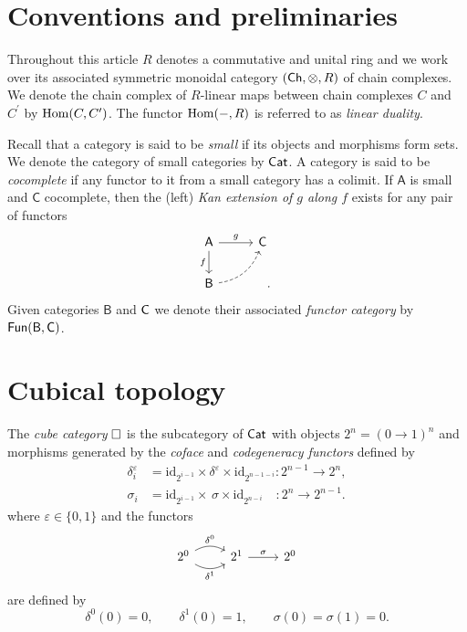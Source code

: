 
\section{Conventions and preliminaries}

Throughout this article $R$ denotes a commutative and unital ring and we work over its associated symmetric monoidal category $(\mathsf{Ch}, \otimes, R)$ of chain complexes.
We denote the chain complex of $R$-linear maps between chain complexes $C$ and $C^\prime$ by $\mathrm{Hom}(C, C^\prime)$.
The functor $\mathrm{Hom}(-, R)$ is referred to as \textit{linear duality}.

Recall that a category is said to be \textit{small} if its objects and morphisms form sets.
We denote the category of small categories by $\mathsf{Cat}$.
A category is said to be \textit{cocomplete} if any functor to it from a small category has a colimit.
If $\mathsf{A}$ is small and $\mathsf{C}$ cocomplete, then the (left) \textit{Kan extension of $g$ along $f$} exists for any pair of functors
\begin{equation*}
\begin{tikzcd}[column sep=normal, row sep=normal]
\mathsf{A} \arrow[d, "f"'] \arrow[r, "g"] & \mathsf{C} \\ 
\mathsf{B} \arrow[dashed, ur, bend right] & \quad .
\end{tikzcd}
\end{equation*}
Given categories $\mathsf{B}$ and $\mathsf{C}$ we denote their associated \textit{functor category} by $\mathsf{Fun}(\mathsf{B}, \mathsf{C})$.

\section{Cubical topology}

The \textit{cube category} $\square$ is the subcategory of $\mathsf{Cat}$ with objects $2^n = (0 \to 1)^n$ and morphisms generated by the \textit{coface} and \textit{codegeneracy functors} defined by
\begin{align*}
\delta_i^\varepsilon & = \mathrm{id}_{2^{i-1}} \times \delta^\varepsilon \times \mathrm{id}_{2^{n-1-i}} \colon 2^{n-1} \to 2^n, \\
\sigma_i & = \mathrm{id}_{2^{i-1}} \times \, \sigma \times \mathrm{id}_{2^{n-i}} \quad \colon 2^{n} \to 2^{n-1}.
\end{align*}
where $\varepsilon \in \{0,1\}$ and the functors
\begin{equation*}
\begin{tikzcd}
2^0 \arrow[r, bend left, "\delta^0"] \arrow[r, bend right, "\delta^1"'] & 2^1 \arrow[r, "\sigma"] & 2^0
\end{tikzcd}
\end{equation*}
are defined by
\begin{equation*}
\delta^0(0) = 0, \qquad \delta^1(0) = 1, \qquad \sigma(0) = \sigma(1) = 0.
\end{equation*}

